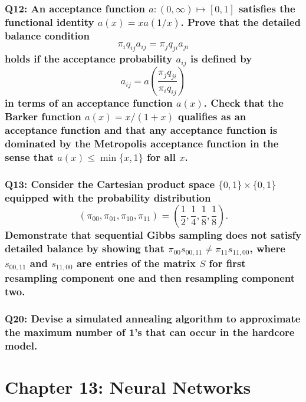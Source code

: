 \documentclass[8pt]{article}
\begin{document}
\subsubsection*{Q12:
An acceptance function \(a : (0, \infty) \mapsto [0, 1]\) satisfies the functional identity \(a(x) = x a(1/x)\). Prove that the detailed balance condition
\[
\pi_i q_{ij} a_{ij} = \pi_j q_{ji} a_{ji}
\]
holds if the acceptance probability \(a_{ij}\) is defined by
\[
a_{ij} = a \left( \frac{\pi_j q_{ji}}{\pi_i q_{ij}} \right)
\]
in terms of an acceptance function \(a(x)\). Check that the Barker function \(a(x) = x / (1 + x)\) qualifies as an acceptance function and that any acceptance function is dominated by the Metropolis acceptance function in the sense that \(a(x) \leq \min\{x, 1\}\) for all \(x\).}

\subsubsection*{Q13:
Consider the Cartesian product space \(\{0, 1\} \times \{0, 1\}\) equipped with the probability distribution
\[
(\pi_{00}, \pi_{01}, \pi_{10}, \pi_{11}) = \left( \frac{1}{2}, \frac{1}{4}, \frac{1}{8}, \frac{1}{8} \right).
\]
Demonstrate that sequential Gibbs sampling does not satisfy detailed balance by showing that \(\pi_{00} s_{00, 11} \neq \pi_{11} s_{11, 00}\), where \(s_{00, 11}\) and \(s_{11, 00}\) are entries of the matrix \(S\) for first resampling component one and then resampling component two.}

\subsubsection*{Q20:
Devise a simulated annealing algorithm to approximate the maximum number of 1’s that can occur in the hardcore model.}

\newpage
\section*{Chapter 13: Neural Networks}
\end{document}
